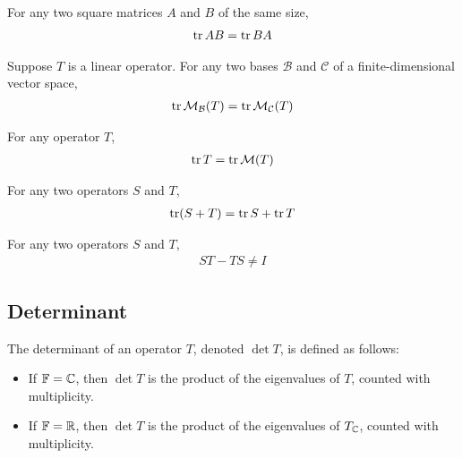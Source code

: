 \documentclass{article}
\begin{document}
\begin{lemma}
  For any two square matrices $A$ and $B$ of the same size,
  \begin{align}
    \tr AB = \tr BA
  \end{align}
\end{lemma}

\begin{lemma}
  Suppose $T$ is a linear operator.
  For any two bases $\mathcal{B}$ and $\mathcal{C}$ of a finite-dimensional vector space,
  \begin{align}
    \tr \mathcal{M}_\mathcal{B}(T) = \tr \mathcal{M}_\mathcal{C}(T)
  \end{align}
\end{lemma}

\begin{theorem}
  For any operator $T$,
  \begin{align}
    \trace T = \tr \mathcal{M}(T)
  \end{align}
\end{theorem}

\begin{corollary}
  For any two operators $S$ and $T$,
  \begin{align}
    \tr (S + T) = \tr S + \tr T
  \end{align}
\end{corollary}

\begin{theorem}[$ST - TS \neq I$]
  For any two operators $S$ and $T$,
  \begin{align}
    ST - TS \neq I
  \end{align}
\end{theorem}

\subsection{Determinant}

\begin{definition}
  The determinant of an operator $T$, denoted $\det T$, is defined as follows:
  \begin{itemize}
    \item If $\mathbb{F} = \mathbb{C}$, then $\det T$ is the product of the eigenvalues of $T$, counted with multiplicity.
    \item If $\mathbb{F} = \mathbb{R}$, then $\det T$ is the product of the eigenvalues of $T_{\mathbb{C}}$, counted with multiplicity.
  \end{itemize}
\end{definition}
\end{document}
